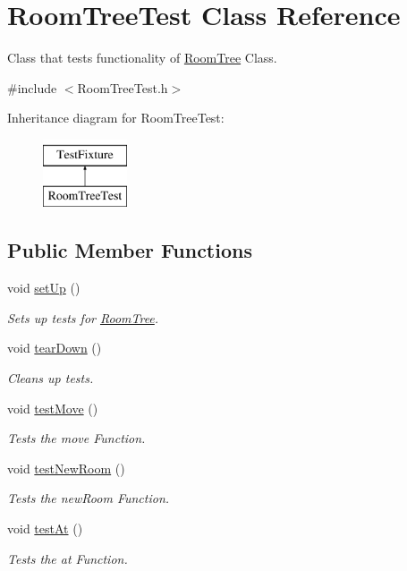 \hypertarget{classRoomTreeTest}{\section{Room\-Tree\-Test Class Reference}
\label{classRoomTreeTest}
}


Class that tests functionality of \hyperlink{classRoomTree}{Room\-Tree} Class.  




{\ttfamily \#include $<$Room\-Tree\-Test.\-h$>$}

Inheritance diagram for Room\-Tree\-Test\-:\begin{figure}[H]
\begin{center}
\leavevmode
\includegraphics[height=2.000000cm]{classRoomTreeTest}
\end{center}
\end{figure}
\subsection*{Public Member Functions}
\begin{DoxyCompactItemize}
\item 
void \hyperlink{classRoomTreeTest_ae70ed88d72b79d6615705caf5a635aca}{set\-Up} ()
\begin{DoxyCompactList}\small\item\em Sets up tests for \hyperlink{classRoomTree}{Room\-Tree}. \end{DoxyCompactList}\item 
void \hyperlink{classRoomTreeTest_afa7584edb8a8267c922160e4d7c9d037}{tear\-Down} ()
\begin{DoxyCompactList}\small\item\em Cleans up tests. \end{DoxyCompactList}\item 
void \hyperlink{classRoomTreeTest_aab3dedfa3aaa0bfab811a8d0d8c8b7e0}{test\-Move} ()
\begin{DoxyCompactList}\small\item\em Tests the move Function. \end{DoxyCompactList}\item 
void \hyperlink{classRoomTreeTest_a1f342a990eb4b60cfae96dac1dbbedee}{test\-New\-Room} ()
\begin{DoxyCompactList}\small\item\em Tests the new\-Room Function. \end{DoxyCompactList}\item 
void \hyperlink{classRoomTreeTest_a7999cf9d9149ade6f39fbb7be601805e}{test\-At} ()
\begin{DoxyCompactList}\small\item\em Tests the at Function. \end{DoxyCompactList}\end{DoxyCompactItemize}
